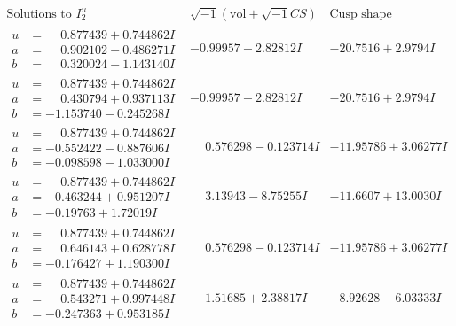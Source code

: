 \documentclass[1p]{elsarticle_modified}
\theoremstyle{definition}
\newcommand{\I}{\sqrt{-1}}
\begin{document}
$$\begin{array}{c|c|c}  
\text{Solutions to }I^u_{2}& \I (\text{vol} + \sqrt{-1}CS) & \text{Cusp shape}\\
 \hline 
\begin{aligned}
u &= \phantom{-}0.877439 + 0.744862 I \\
a &= \phantom{-}0.902102 - 0.486271 I \\
b &= \phantom{-}0.320024 - 1.143140 I\end{aligned}
 & -0.99957 - 2.82812 I & -20.7516 + 2.9794 I \\ \hline\begin{aligned}
u &= \phantom{-}0.877439 + 0.744862 I \\
a &= \phantom{-}0.430794 + 0.937113 I \\
b &= -1.153740 - 0.245268 I\end{aligned}
 & -0.99957 - 2.82812 I & -20.7516 + 2.9794 I \\ \hline\begin{aligned}
u &= \phantom{-}0.877439 + 0.744862 I \\
a &= -0.552422 - 0.887606 I \\
b &= -0.098598 - 1.033000 I\end{aligned}
 & \phantom{-}0.576298 - 0.123714 I & -11.95786 + 3.06277 I \\ \hline\begin{aligned}
u &= \phantom{-}0.877439 + 0.744862 I \\
a &= -0.463244 + 0.951207 I \\
b &= -0.19763 + 1.72019 I\end{aligned}
 & \phantom{-}3.13943 - 8.75255 I & -11.6607 + 13.0030 I \\ \hline\begin{aligned}
u &= \phantom{-}0.877439 + 0.744862 I \\
a &= \phantom{-}0.646143 + 0.628778 I \\
b &= -0.176427 + 1.190300 I\end{aligned}
 & \phantom{-}0.576298 - 0.123714 I & -11.95786 + 3.06277 I \\ \hline\begin{aligned}
u &= \phantom{-}0.877439 + 0.744862 I \\
a &= \phantom{-}0.543271 + 0.997448 I \\
b &= -0.247363 + 0.953185 I\end{aligned}
 & \phantom{-}1.51685 + 2.38817 I & -8.92628 - 6.03333 I \\ \hline\begin{aligned}

\end{aligned}
\end{array}$$
\end{document}
